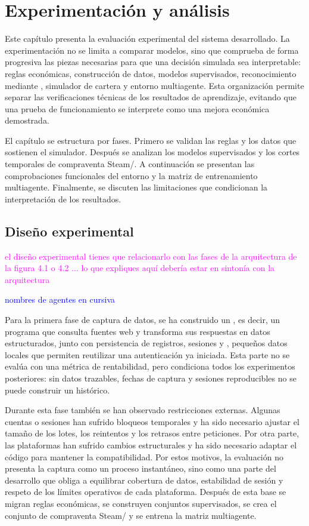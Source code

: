 \chapter{Experimentación y análisis}

\noindent Este capítulo presenta la evaluación experimental del sistema desarrollado. La experimentación no se limita a comparar modelos, sino que comprueba de forma progresiva las piezas necesarias para que una decisión simulada sea interpretable: reglas económicas, construcción de datos, modelos supervisados, reconocimiento mediante , simulador de cartera y entorno multiagente. Esta organización permite separar las verificaciones técnicas de los resultados de aprendizaje, evitando que una prueba de funcionamiento se interprete como una mejora económica demostrada.

El capítulo se estructura por fases. Primero se validan las reglas y los datos que sostienen el simulador. Después se analizan los modelos supervisados y los cortes temporales de compraventa Steam/. A continuación se presentan las comprobaciones funcionales del entorno  y la matriz de entrenamiento multiagente. Finalmente, se discuten las limitaciones que condicionan la interpretación de los resultados.

\section{Diseño experimental}

\textcolor{magenta}{el diseño experimental tienes que relacionarlo con las fases de la arquitectura de la figura 4.1 o 4.2 ... lo que expliques aquí debería estar en sintonía con la arquitectura}

\textcolor{blue}{nombres de agentes en cursiva}

Para la primera fase de captura de datos, se ha construido un , es decir, un programa que consulta fuentes web y transforma sus respuestas en datos estructurados, junto con persistencia de registros, sesiones y , pequeños datos locales que permiten reutilizar una autenticación ya iniciada. Esta parte no se evalúa con una métrica de rentabilidad, pero condiciona todos los experimentos posteriores: sin datos trazables, fechas de captura y sesiones reproducibles no se puede construir un histórico.

Durante esta fase también se han observado restricciones externas. Algunas cuentas o sesiones han sufrido bloqueos temporales y ha sido necesario ajustar el tamaño de los lotes, los reintentos y los retrasos entre peticiones. Por otra parte, las plataformas han sufrido cambios estructurales y ha sido necesario adaptar el código para mantener la compatibilidad. Por estos motivos, la evaluación no presenta la captura como un proceso instantáneo, sino como una parte del desarrollo que obliga a equilibrar cobertura de datos, estabilidad de sesión y respeto de los límites operativos de cada plataforma. Después de esta base se migran reglas económicas, se construyen conjuntos supervisados, se crea el conjunto de compraventa Steam/ y se entrena la matriz multiagente.


